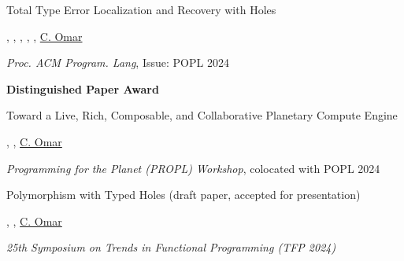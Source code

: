 \documentclass[10pt,letterpaper]{article}
\renewenvironment{itemize}{
  \begin{list}{}{
    \setlength{\leftmargin}{1.25em}
    \setlength{\itemsep}{0.25em}
    \setlength{\parskip}{0pt}
    \setlength{\parsep}{0.2em}
  }
}{
  \end{list}
}
\begin{document}
\begin{enumerate}[leftmargin=*, labelindent=6.5em, font=\bfseries]
  \item[POPL 2024] {Total Type Error Localization and Recovery with Holes}
  \begin{itemize}
    \item {}, , , , , \underline{C. Omar}
    \item \textit{Proc. ACM Program. Lang}, Issue: POPL 2024
    \item \textbf{Distinguished Paper Award}
  \end{itemize}
  \item[PROPL 2024] {Toward a Live, Rich, Composable, and Collaborative Planetary Compute Engine}
  \begin{itemize}
    \item {}, , \underline{C. Omar}
    \item \textit{Programming for the Planet (PROPL) Workshop}, colocated with POPL 2024
  \end{itemize}
  \item[TFP 2024] {Polymorphism with Typed Holes} (draft paper, accepted for presentation)
  \begin{itemize}
    \item {}, , \underline{C. Omar}
    \item \textit{25th Symposium on Trends in Functional Programming (TFP 2024)}

\end{itemize}
\end{enumerate}
\end{document}
